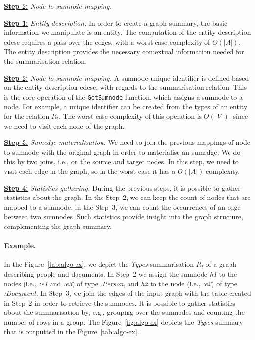 \begin{labeling}{\textbf{\underline{Step 2:}} \emph{Node to sumnode mapping.}}
\item[\textbf{\underline{Step 1:}} \emph{Entity description.}]
\label{step-ed}
In order to create a graph summary, the basic information we manipulate is an entity. The computation of the entity description \gls{edesc} requires a pass over the edges, with a worst case complexity of $O(\vert A \vert)$. The entity description provides the necessary contextual information needed for the summarisation relation.

\item[\textbf{\underline{Step 2:}} \emph{Node to sumnode mapping.}]
\label{step-hn}
A sumnode unique identifier is defined based on the entity description \gls{edesc}, with regards to the summarisation relation. This is the core operation of the \texttt{GetSumnode} function, which assigns a sumnode to a node. For example, a unique identifier can be created from the types of an entity for the relation $R_t$.
The worst case complexity of this operation is $O(\vert V \vert)$, since we need to visit each node of the graph.

\item[\textbf{\underline{Step 3:}} \emph{Sumedge materialisation.}]
\label{step-he}
We need to join the previous mappings of node to sumnode with the original graph in order to materialise an sumedge. We do this by two joins, i.e., on the source and target nodes. In this step, we need to visit each edge in the graph, so in the worst case it has a $O\left(\vert A \vert\right)$ complexity.

\item[\textbf{\underline{Step 4:}} \emph{Statistics gathering.}]
\label{step-stats}
During the previous steps, it is possible to gather statistics about the graph. In the Step~2, we can keep the count of nodes that are mapped to a sumnode. In the Step~3, we can count the occurrences of an edge between two sumnodes. Such statistics provide insight into the graph structure, complementing the graph summary.
\end{labeling}

\paragraph{Example.}

In the Figure~\ref{tab:algo-ex}, we depict the \emph{Types} summarisation $R_t$ of a graph describing people and documents. In Step~2 we assign the sumnode \emph{h1} to the nodes (i.e., \emph{:e1} and \emph{:e3}) of type \emph{:Person}, and \emph{h2} to the node (i.e., \emph{:e2}) of type \emph{:Document}. In Step~3, we join the edges of the input graph with the table created in Step~2 in order to retrieve the sumnodes.
It is possible to gather statistics about the summarisation by, e.g., grouping over the sumnodes and counting the number of rows in a group. The Figure~\ref{fig:algo-ex} depicts the \emph{Types} summary that is outputted in the Figure~\ref{tab:algo-ex}.

